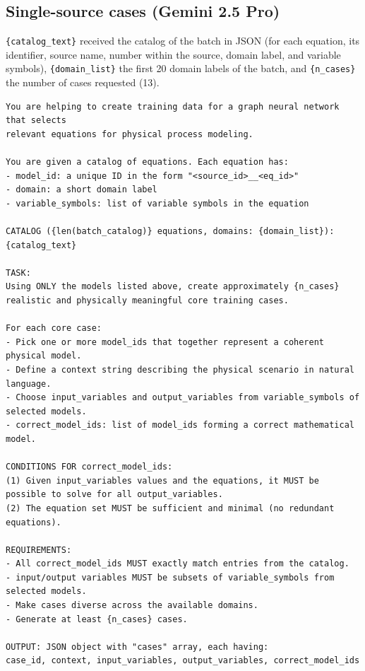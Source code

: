 \subsection*{Single-source cases (Gemini 2.5 Pro)}
\texttt{\{catalog\_text\}} received the catalog of the batch in JSON (for each equation, its
identifier, source name, number within the source, domain label, and variable symbols),
\texttt{\{domain\_list\}} the first 20 domain labels of the batch, and \texttt{\{n\_cases\}} the
number of cases requested (13).
\begin{Verbatim}[fontsize=\scriptsize, breaklines=true, frame=single]
You are helping to create training data for a graph neural network that selects
relevant equations for physical process modeling.

You are given a catalog of equations. Each equation has:
- model_id: a unique ID in the form "<source_id>__<eq_id>"
- domain: a short domain label
- variable_symbols: list of variable symbols in the equation

CATALOG ({len(batch_catalog)} equations, domains: {domain_list}):
{catalog_text}

TASK:
Using ONLY the models listed above, create approximately {n_cases}
realistic and physically meaningful core training cases.

For each core case:
- Pick one or more model_ids that together represent a coherent physical model.
- Define a context string describing the physical scenario in natural language.
- Choose input_variables and output_variables from variable_symbols of selected models.
- correct_model_ids: list of model_ids forming a correct mathematical model.

CONDITIONS FOR correct_model_ids:
(1) Given input_variables values and the equations, it MUST be possible to solve for all output_variables.
(2) The equation set MUST be sufficient and minimal (no redundant equations).

REQUIREMENTS:
- All correct_model_ids MUST exactly match entries from the catalog.
- input/output variables MUST be subsets of variable_symbols from selected models.
- Make cases diverse across the available domains.
- Generate at least {n_cases} cases.

OUTPUT: JSON object with "cases" array, each having:
case_id, context, input_variables, output_variables, correct_model_ids
\end{Verbatim}

